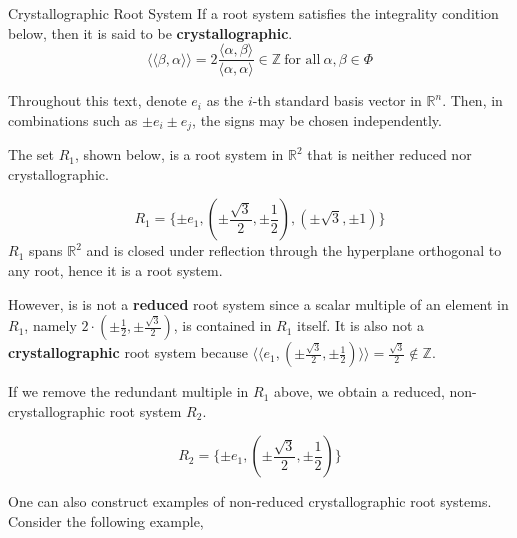 \begin{nameddefinition}{Crystallographic Root System}
    If a root system satisfies the integrality condition below, then it is said to be \textbf{crystallographic}.
    \begin{equation*}
        \langle \langle \beta, \alpha \rangle \rangle = 2 \frac{ \langle \alpha, \beta \rangle}{\langle \alpha, \alpha \rangle} \in \mathbb{Z} \ \text{for all} \ \alpha, \beta \in \Phi
    \end{equation*}
\end{nameddefinition}

Throughout this text, denote $e_i$ as the $i$-th standard basis vector in $\mathbb{R}^n$. Then, in combinations such as $\pm e_i \pm e_j$, the signs may be chosen independently.

\begin{example}
    The set $R_1$, shown below, is a root system in $\mathbb{R}^2$ that is neither reduced nor crystallographic.
    
    \begin{equation*}
        R_1 = \{
            \pm e_1, (\pm \frac{\sqrt{3}}{2}, \pm \frac{1}{2}), (\pm \sqrt{3}, \pm 1) 
        \} 
    \end{equation*}
    $R_1$ spans $\mathbb{R}^2$ and is closed under reflection through the hyperplane orthogonal to any root, hence it is a root system.
    
    However, is is not a \textbf{reduced} root system since a scalar multiple of an element in $R_1$, namely $2 \cdot (\pm \frac{1}{2}, \pm \frac{\sqrt{3}}{2})$, is contained in $R_1$ itself. 
    It is also not a \textbf{crystallographic} root system because $ \langle \langle e_1, (\pm \frac{\sqrt{3}}{2}, \pm \frac{1}{2}) \rangle \rangle = \frac{\sqrt{3}}{2} \notin \mathbb{Z}$.
\end{example}

\begin{example}
    If we remove the redundant multiple in $R_1$ above, we obtain a reduced, non-crystallographic root system $R_2$.
    
    \begin{equation*}
        R_2 = \{
            \pm e_1, (\pm \frac{\sqrt{3}}{2}, \pm \frac{1}{2})
        \} 
    \end{equation*}
\end{example}

One can also construct examples of non-reduced crystallographic root systems. Consider the following example,

